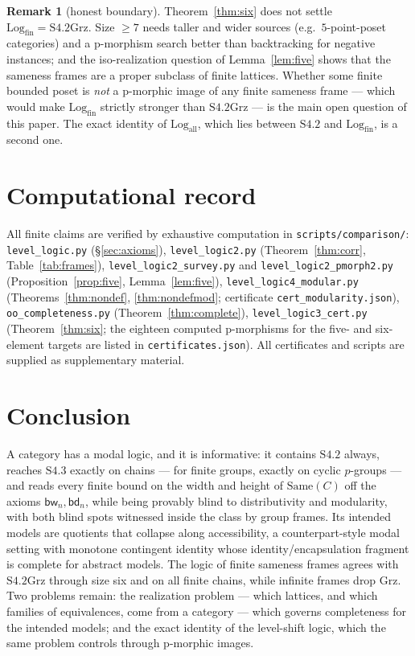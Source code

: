 \documentclass[11pt]{amsart}
\theoremstyle{definition}
\newtheorem{rem}[thm]{Remark}
\newcommand{\Same}{\mathrm{Same}}
\newcommand{\Log}{\mathrm{Log}}
\newcommand{\bw}{\mathsf{bw}}
\newcommand{\bd}{\mathsf{bd}}
\newcommand{\Grz}{\mathrm{Grz}}
\begin{document}
\begin{rem}[honest boundary]
Theorem~\ref{thm:six} does not settle $\Log_{\mathrm{fin}}=\mathrm{S4.2Grz}$. Size
$\ge7$ needs taller and wider sources (e.g.\ $5$-point-poset categories) and a
p-morphism search better than backtracking for negative instances; and the
iso-realization question of Lemma~\ref{lem:five} shows that the sameness
frames are a proper subclass of finite lattices. Whether some finite bounded
poset is \emph{not} a p-morphic image of any finite sameness frame --- which
would make $\Log_{\mathrm{fin}}$ strictly stronger than $\mathrm{S4.2Grz}$ --- is
the main open question of this paper. The exact identity of
$\Log_{\mathrm{all}}$, which lies between $\mathrm{S4.2}$ and
$\Log_{\mathrm{fin}}$, is a second one.
\end{rem}

\section{Computational record}\label{sec:comp}
All finite claims are verified by exhaustive computation in
\texttt{scripts/comparison/}: \texttt{level\_logic.py} (\S\ref{sec:axioms}),
\texttt{level\_logic2.py} (Theorem~\ref{thm:corr}, Table~\ref{tab:frames}),
\texttt{level\_logic2\_survey.py} and \texttt{level\_logic2\_pmorph2.py}
(Proposition~\ref{prop:five}, Lemma~\ref{lem:five}),
\texttt{level\_logic4\_modular.py} (Theorems~\ref{thm:nondef},
\ref{thm:nondefmod}; certificate \texttt{cert\_modularity.json}),
\texttt{oo\_completeness.py} (Theorem~\ref{thm:complete}),
\texttt{level\_logic3\_cert.py} (Theorem~\ref{thm:six}; the eighteen computed
p-morphisms for the five- and six-element targets are listed in
\texttt{certificates.json}). All certificates and scripts are supplied as
supplementary material.

\section{Conclusion}
A category has a modal logic, and it is informative: it contains
$\mathrm{S4.2}$ always, reaches $\mathrm{S4.3}$ exactly on chains --- for finite
groups, exactly on cyclic $p$-groups --- and reads every finite bound on the
width and height of $\Same(C)$ off the axioms $\bw_n,\bd_n$, while being
provably blind to
distributivity and modularity, with both blind spots witnessed inside the class
by group frames. Its
intended models are quotients that collapse along accessibility, a
counterpart-style modal setting with monotone contingent identity whose
identity/encapsulation fragment is complete for abstract models. The logic of
finite sameness frames agrees with $\mathrm{S4.2Grz}$ through size six and on
all finite chains, while infinite frames drop $\Grz$. Two problems remain: the realization problem --- which lattices, and
which families of equivalences, come from a category --- which governs
completeness for the intended models; and the exact identity of the
level-shift logic, which the same problem controls through p-morphic images.
\end{document}
